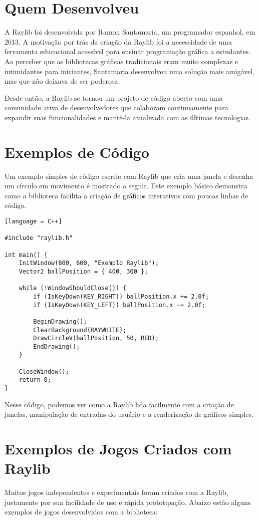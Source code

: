 \documentclass[a4paper,12pt]{article}
\begin{document}
\section{Quem Desenvolveu}
A Raylib foi desenvolvida por Ramon Santamaria, um programador espanhol, em 2013. A motivação por trás da criação da Raylib foi a necessidade de uma ferramenta educacional acessível para ensinar programação gráfica a estudantes. Ao perceber que as bibliotecas gráficas tradicionais eram muito complexas e intimidantes para iniciantes, Santamaria desenvolveu uma solução mais amigável, mas que não deixava de ser poderosa.

Desde então, a Raylib se tornou um projeto de código aberto com uma comunidade ativa de desenvolvedores que colaboram continuamente para expandir suas funcionalidades e mantê-la atualizada com as últimas tecnologias.

\section{Exemplos de Código}
Um exemplo simples de código escrito com Raylib que cria uma janela e desenha um círculo em movimento é mostrado a seguir. Este exemplo básico demonstra como a biblioteca facilita a criação de gráficos interativos com poucas linhas de código.

\begin{lstlisting}
[language = C++]

#include "raylib.h"

int main() {
    InitWindow(800, 600, "Exemplo Raylib");
    Vector2 ballPosition = { 400, 300 };

    while (!WindowShouldClose()) {
        if (IsKeyDown(KEY_RIGHT)) ballPosition.x += 2.0f;
        if (IsKeyDown(KEY_LEFT)) ballPosition.x -= 2.0f;

        BeginDrawing();
        ClearBackground(RAYWHITE);
        DrawCircleV(ballPosition, 50, RED);
        EndDrawing();
    }

    CloseWindow();
    return 0;
}
\end{lstlisting}

Nesse código, podemos ver como a Raylib lida facilmente com a criação de janelas, manipulação de entradas do usuário e a renderização de gráficos simples.

\section{Exemplos de Jogos Criados com Raylib}
Muitos jogos independentes e experimentais foram criados com a Raylib, justamente por sua facilidade de uso e rápida prototipação. Abaixo estão alguns exemplos de jogos desenvolvidos com a biblioteca:
\end{document}
